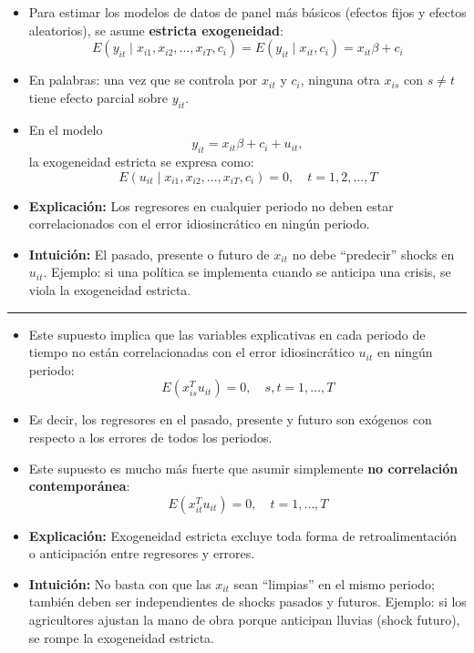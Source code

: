\documentclass[12pt]{article}
\begin{document}
\begin{itemize}
    \item Para estimar los modelos de datos de panel más básicos (efectos fijos y efectos aleatorios), 
    se asume \textbf{estricta exogeneidad}:
    \[
    E(y_{it} \mid x_{i1}, x_{i2}, ..., x_{iT}, c_i) 
    = E(y_{it}\mid x_{it}, c_i) 
    = x_{it}\beta + c_i
    \]
    \item En palabras: una vez que se controla por $x_{it}$ y $c_i$, ninguna otra $x_{is}$ 
    con $s \neq t$ tiene efecto parcial sobre $y_{it}$.
    \item En el modelo 
    \[
    y_{it} = x_{it}\beta + c_i + u_{it},
    \]
    la exogeneidad estricta se expresa como:
    \[
    E(u_{it} \mid x_{i1}, x_{i2},..., x_{iT}, c_i) = 0, 
    \quad t=1,2,\ldots,T
    \]
\end{itemize}

\begin{itemize}
    \item \textbf{Explicación:} Los regresores en cualquier periodo no deben estar correlacionados con el error idiosincrático en ningún periodo.
    \item \textbf{Intuición:} El pasado, presente o futuro de $x_{it}$ no debe “predecir” shocks en $u_{it}$.  
    Ejemplo: si una política se implementa cuando se anticipa una crisis, se viola la exogeneidad estricta.
\end{itemize}

\hrule

\begin{itemize}
    \item Este supuesto implica que las variables explicativas en cada periodo de tiempo 
    no están correlacionadas con el error idiosincrático $u_{it}$ en ningún periodo:
    \[
    E(x_{is}^T u_{it}) = 0, 
    \quad s,t=1,\ldots,T
    \]
    \item Es decir, los regresores en el pasado, presente y futuro son exógenos con respecto a los errores de todos los periodos.
    \item Este supuesto es mucho más fuerte que asumir simplemente \textbf{no correlación contemporánea}:
    \[
    E(x_{it}^T u_{it}) = 0, 
    \quad t=1,\ldots,T
    \]
\end{itemize}

\begin{itemize}
    \item \textbf{Explicación:} Exogeneidad estricta excluye toda forma de retroalimentación o anticipación entre regresores y errores.
    \item \textbf{Intuición:} No basta con que las $x_{it}$ sean “limpias” en el mismo periodo; también deben ser independientes de shocks pasados y futuros.  
    Ejemplo: si los agricultores ajustan la mano de obra porque anticipan lluvias (shock futuro), se rompe la exogeneidad estricta.
\end{itemize}
\end{document}
